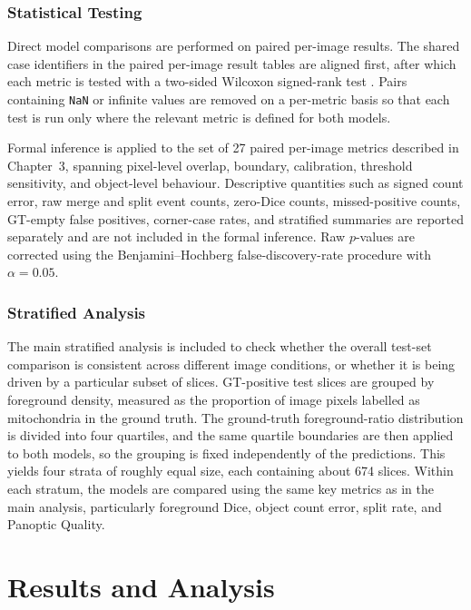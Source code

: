 \documentclass[logo,bsc,singlespacing,parskip,online]{infthesis}
\begin{document}
\subsection{Statistical Testing}

Direct model comparisons are performed on paired per-image results. The shared
case identifiers in the paired per-image result tables are aligned first, after
which each metric is tested with a two-sided Wilcoxon signed-rank test
\citep{wilcoxon1945individual}. Pairs containing \texttt{NaN} or infinite
values are removed on a per-metric basis so that each test is run only where
the relevant metric is defined for both models.

Formal inference is applied to the set of 27 paired per-image
metrics described in Chapter~3, spanning pixel-level overlap, boundary,
calibration, threshold sensitivity, and object-level behaviour. Descriptive
quantities such as signed count error, raw merge and split event counts,
zero-Dice counts, missed-positive counts, GT-empty false positives, corner-case
rates, and stratified summaries are reported separately and are not included in
the formal inference. Raw $p$-values are corrected using the
Benjamini--Hochberg false-discovery-rate procedure
\citep{benjamini1995controlling} with $\alpha = 0.05$.

\subsection{Stratified Analysis}

The main stratified analysis is included to check whether the overall test-set
comparison is consistent across different image conditions, or whether it is
being driven by a particular subset of slices. GT-positive test slices are grouped by
foreground density, measured as the proportion of image pixels labelled as
mitochondria in the ground truth. 
The ground-truth foreground-ratio distribution is divided into four quartiles,
and the same quartile boundaries are then applied to both models, so the
grouping is fixed independently of the predictions. This yields four strata of
roughly equal size, each containing about 674 slices. Within each stratum, the
models are compared using the same key metrics as in the main analysis,
particularly foreground Dice, object count error, split rate, and Panoptic
Quality.



\chapter{Results and Analysis}
\label{chap:results}
\end{document}
